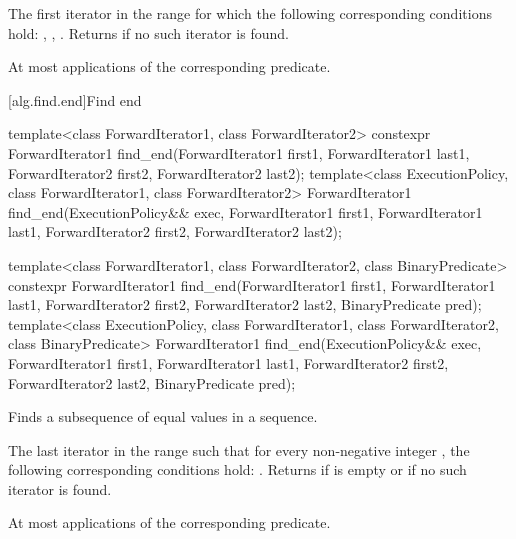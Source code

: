 \begin{itemdescr}
\pnum
\returns
The first iterator
in the range
for which the following corresponding
conditions hold:
, , .
Returns  if no such iterator is found.

\pnum
\complexity
At most
applications of the corresponding predicate.
\end{itemdescr}

[alg.find.end]{Find end}

%
\begin{itemdecl}
template<class ForwardIterator1, class ForwardIterator2>
  constexpr ForwardIterator1
    find_end(ForwardIterator1 first1, ForwardIterator1 last1,
             ForwardIterator2 first2, ForwardIterator2 last2);
template<class ExecutionPolicy, class ForwardIterator1, class ForwardIterator2>
  ForwardIterator1
    find_end(ExecutionPolicy&& exec,
             ForwardIterator1 first1, ForwardIterator1 last1,
             ForwardIterator2 first2, ForwardIterator2 last2);

template<class ForwardIterator1, class ForwardIterator2,
         class BinaryPredicate>
  constexpr ForwardIterator1
    find_end(ForwardIterator1 first1, ForwardIterator1 last1,
             ForwardIterator2 first2, ForwardIterator2 last2,
             BinaryPredicate pred);
template<class ExecutionPolicy, class ForwardIterator1, class ForwardIterator2,
         class BinaryPredicate>
  ForwardIterator1
    find_end(ExecutionPolicy&& exec,
             ForwardIterator1 first1, ForwardIterator1 last1,
             ForwardIterator2 first2, ForwardIterator2 last2,
             BinaryPredicate pred);
\end{itemdecl}

\begin{itemdescr}
\pnum
\effects
Finds a subsequence of equal values in a sequence.

\pnum
\returns
The last iterator
in the range 
such that for every non-negative integer
,
the following corresponding conditions hold:
.
Returns 
if
 is empty or if
no such iterator is found.

\pnum
\complexity
At most
applications of the corresponding predicate.
\end{itemdescr}

